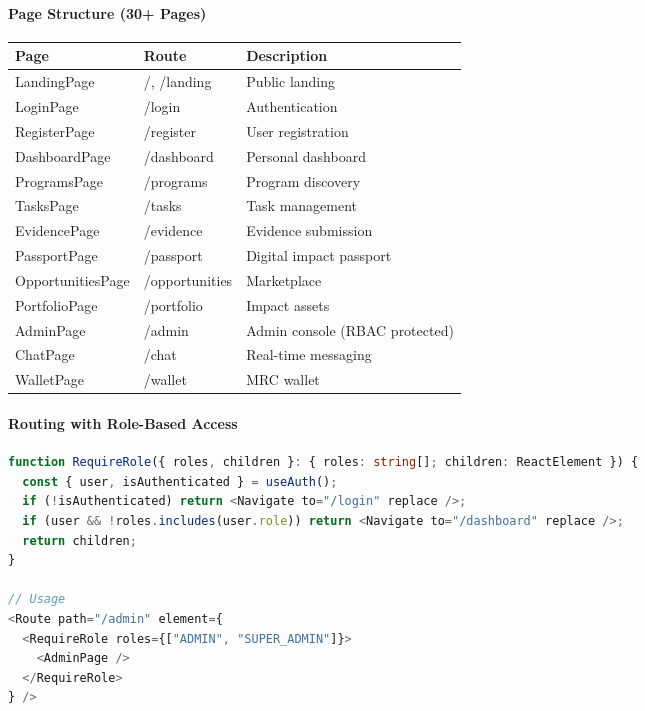 \documentclass[11pt,a4paper]{article}
\begin{document}
\paragraph{Page Structure (30+ Pages)}

\begin{table}[H]
\centering
\begin{tabular}{|l|l|l|}
\hline
Page & Route & Description \\
\hline
LandingPage & /, /landing & Public landing \\
\hline
LoginPage & /login & Authentication \\
\hline
RegisterPage & /register & User registration \\
\hline
DashboardPage & /dashboard & Personal dashboard \\
\hline
ProgramsPage & /programs & Program discovery \\
\hline
TasksPage & /tasks & Task management \\
\hline
EvidencePage & /evidence & Evidence submission \\
\hline
PassportPage & /passport & Digital impact passport \\
\hline
OpportunitiesPage & /opportunities & Marketplace \\
\hline
PortfolioPage & /portfolio & Impact assets \\
\hline
AdminPage & /admin & Admin console (RBAC protected) \\
\hline
ChatPage & /chat & Real-time messaging \\
\hline
WalletPage & /wallet & MRC wallet \\
\hline
\end{tabular}
\end{table}

\paragraph{Routing with Role-Based Access}

\begin{lstlisting}[language=typescript, caption=typescript code]
function RequireRole({ roles, children }: { roles: string[]; children: ReactElement }) {
  const { user, isAuthenticated } = useAuth();
  if (!isAuthenticated) return <Navigate to="/login" replace />;
  if (user && !roles.includes(user.role)) return <Navigate to="/dashboard" replace />;
  return children;
}

// Usage
<Route path="/admin" element={
  <RequireRole roles={["ADMIN", "SUPER_ADMIN"]}>
    <AdminPage />
  </RequireRole>
} />
\end{lstlisting}
\end{document}

